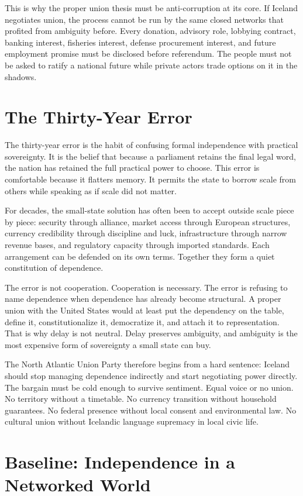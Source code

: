 \documentclass[11pt,a4paper]{article}
\newcommand{\PartyEN}{The North Atlantic Union Party}
\begin{document}
This is why the proper union thesis must be anti-corruption at its core. If Iceland negotiates union, the process cannot be run by the same closed networks that profited from ambiguity before. Every donation, advisory role, lobbying contract, banking interest, fisheries interest, defense procurement interest, and future employment promise must be disclosed before referendum. The people must not be asked to ratify a national future while private actors trade options on it in the shadows.

\section{The Thirty-Year Error}
The thirty-year error is the habit of confusing formal independence with practical sovereignty. It is the belief that because a parliament retains the final legal word, the nation has retained the full practical power to choose. This error is comfortable because it flatters memory. It permits the state to borrow scale from others while speaking as if scale did not matter.

For decades, the small-state solution has often been to accept outside scale piece by piece: security through alliance, market access through European structures, currency credibility through discipline and luck, infrastructure through narrow revenue bases, and regulatory capacity through imported standards. Each arrangement can be defended on its own terms. Together they form a quiet constitution of dependence.

The error is not cooperation. Cooperation is necessary. The error is refusing to name dependence when dependence has already become structural. A proper union with the United States would at least put the dependency on the table, define it, constitutionalize it, democratize it, and attach it to representation. That is why delay is not neutral. Delay preserves ambiguity, and ambiguity is the most expensive form of sovereignty a small state can buy.

\PartyEN{} therefore begins from a hard sentence: Iceland should stop managing dependence indirectly and start negotiating power directly. The bargain must be cold enough to survive sentiment. Equal voice or no union. No territory without a timetable. No currency transition without household guarantees. No federal presence without local consent and environmental law. No cultural union without Icelandic language supremacy in local civic life.

\section{Baseline: Independence in a Networked World}
\end{document}
